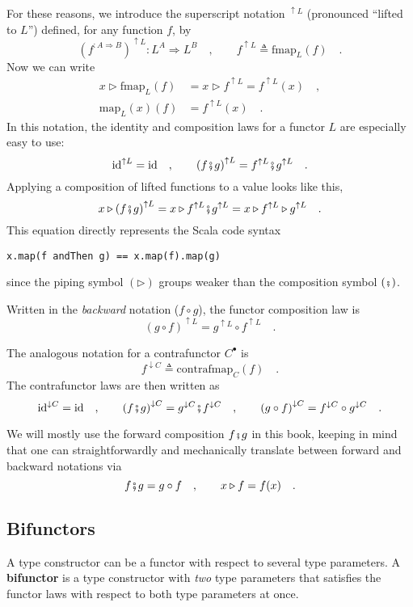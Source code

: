 For these reasons, we introduce the superscript notation $^{\uparrow L}$
(pronounced ``lifted to $L$'') defined, for any function $f$,
by
\[
(f^{:A\Rightarrow B})^{\uparrow L}:L^{A}\Rightarrow L^{B}\quad,\quad\quad f^{\uparrow L}\triangleq\text{fmap}_{L}(f)\quad.
\]
Now we can write 
\begin{align*}
x\triangleright\text{fmap}_{L}(f) & =x\triangleright f^{\uparrow L}=f^{\uparrow L}(x)\quad,\\
\text{map}_{L}(x)(f) & =f^{\uparrow L}(x)\quad.
\end{align*}
In this notation, the identity and composition laws for a functor
$L$ are especially easy to use:
\[
\text{id}^{\uparrow L}=\text{id}\quad,\quad\quad\left(f\bef g\right)^{\uparrow L}=f^{\uparrow L}\bef g^{\uparrow L}\quad.
\]
Applying a composition of lifted functions to a value looks like this,
\[
x\triangleright\left(f\bef g\right)^{\uparrow L}=x\triangleright f^{\uparrow L}\bef g^{\uparrow L}=x\triangleright f^{\uparrow L}\triangleright g^{\uparrow L}\quad.
\]
This equation directly represents the Scala code syntax
\begin{lstlisting}
x.map(f andThen g) == x.map(f).map(g)
\end{lstlisting}
since the piping symbol $\left(\triangleright\right)$ groups weaker
than the composition symbol $\left(\bef\right)$.

Written in the \emph{backward} notation ($f\circ g$), the functor
composition law is
\[
\left(g\circ f\right)^{\uparrow L}=g^{\uparrow L}\circ f^{\uparrow L}\quad.
\]

The analogous notation for a contrafunctor $C^{\bullet}$ is
\[
f^{\downarrow C}\triangleq\text{contrafmap}_{C}(f)\quad.
\]
The contrafunctor laws are then written as
\[
\text{id}^{\downarrow C}=\text{id}\quad,\quad\quad\left(f\bef g\right)^{\downarrow C}=g^{\downarrow C}\bef f^{\downarrow C}\quad,\quad\quad\left(g\circ f\right)^{\downarrow C}=f^{\downarrow C}\circ g^{\downarrow C}\quad.
\]

We will mostly use the forward composition $f\bef g$ in this book,
keeping in mind that one can straightforwardly and mechanically translate
between forward and backward notations via 
\[
f\bef g=g\circ f\quad,\quad\quad x\triangleright f=f(x)\quad.
\]


\subsection{Bifunctors\label{subsec:Bifunctors}}

A type constructor can be a functor with respect to several type parameters.
A \textbf{bifunctor} is a type constructor with
\emph{two} type parameters that satisfies the functor laws with respect
to both type parameters at once.

